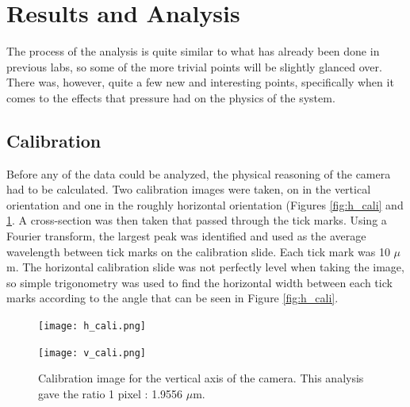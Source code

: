 \documentclass[12pt]{article}
\begin{document}

\section{Results and Analysis}
The process of the analysis is quite similar to what has already been done in previous labs, so some of the more trivial points will be slightly glanced over. There was, however, quite a few new and interesting points, specifically when it comes to the effects that pressure had on the physics of the system. 

\subsection{Calibration}
Before any of the data could be analyzed, the physical reasoning of the camera had to be calculated. Two calibration images were taken, on in the vertical orientation and one in the roughly horizontal orientation (Figures \ref{fig:h_cali} and \ref{fig:v_cali}. A cross-section was then taken that passed through the tick marks. Using a Fourier transform, the largest peak was identified and used as the average wavelength between tick marks on the calibration slide. Each tick mark was 10 $\mu$m. The horizontal calibration slide was not perfectly level when taking the image, so simple trigonometry was used to find the horizontal width between each tick marks according to the angle that can be seen in Figure \ref{fig:h_cali}. 

\begin{figure}
\texttt{[image: h\_cali.png]}\
\caption{Calibration image for the horizontal axis of the camera. This analysis gave the ratio 1 pixel : 1.9556 $\mu$m.}
\label{fig:h_cali}

\texttt{[image: v\_cali.png]}\
\caption{Calibration image for the vertical axis of the camera. This analysis gave the ratio 1 pixel : 1.9556 $\mu$m.}
\label{fig:v_cali}
\end{figure}
\end{document}
